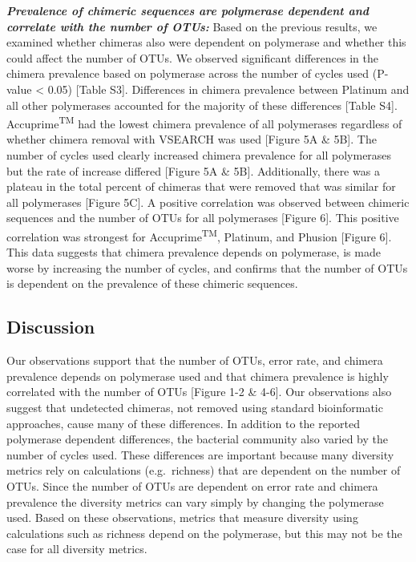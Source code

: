 \documentclass[11pt,]{article}
\begin{document}
\textbf{\emph{Prevalence of chimeric sequences are polymerase dependent
and correlate with the number of OTUs:}} Based on the previous results,
we examined whether chimeras also were dependent on polymerase and
whether this could affect the number of OTUs. We observed significant
differences in the chimera prevalence based on polymerase across the
number of cycles used (P-value \textless{} 0.05) {[}Table S3{]}.
Differences in chimera prevalence between Platinum and all other
polymerases accounted for the majority of these differences {[}Table
S4{]}. Accuprime\textsuperscript{TM} had the lowest chimera prevalence
of all polymerases regardless of whether chimera removal with VSEARCH
was used {[}Figure 5A \& 5B{]}. The number of cycles used clearly
increased chimera prevalence for all polymerases but the rate of
increase differed {[}Figure 5A \& 5B{]}. Additionally, there was a
plateau in the total percent of chimeras that were removed that was
similar for all polymerases {[}Figure 5C{]}. A positive correlation was
observed between chimeric sequences and the number of OTUs for all
polymerases {[}Figure 6{]}. This positive correlation was strongest for
Accuprime\textsuperscript{TM}, Platinum, and Phusion {[}Figure 6{]}.
This data suggests that chimera prevalence depends on polymerase, is
made worse by increasing the number of cycles, and confirms that the
number of OTUs is dependent on the prevalence of these chimeric
sequences.

\newpage

\subsection{Discussion}\label{discussion}

Our observations support that the number of OTUs, error rate, and
chimera prevalence depends on polymerase used and that chimera
prevalence is highly correlated with the number of OTUs {[}Figure 1-2 \&
4-6{]}. Our observations also suggest that undetected chimeras, not
removed using standard bioinformatic approaches, cause many of these
differences. In addition to the reported polymerase dependent
differences, the bacterial community also varied by the number of cycles
used. These differences are important because many diversity metrics
rely on calculations (e.g.~richness) that are dependent on the number of
OTUs. Since the number of OTUs are dependent on error rate and chimera
prevalence the diversity metrics can vary simply by changing the
polymerase used. Based on these observations, metrics that measure
diversity using calculations such as richness depend on the polymerase,
but this may not be the case for all diversity metrics.
\end{document}
